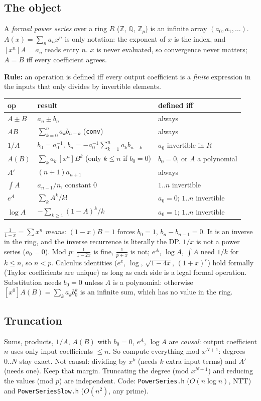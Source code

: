 	\subsection{The object}
	A \emph{formal power series} over a ring $R$ ($\mathbb Z$, $\mathbb Q$, $\mathbb Z_p$) is an infinite array $(a_0,a_1,\dots)$. $A(x)=\sum_n a_nx^n$ is only notation: the exponent of $x$ is the index, and $[x^n]A=a_n$ reads entry $n$. $x$ is never evaluated, so convergence never matters; $A=B$ iff every coefficient agrees.

	\textbf{Rule:} an operation is defined iff every output coefficient is a \emph{finite} expression in the inputs that only divides by invertible elements.
	\begin{center}\small\renewcommand{\arraystretch}{1.3}
	\begin{tabular}{@{}l@{\ \ }L{4.2cm}@{\ \ }L{2.5cm}@{}}
	op & result & defined iff \\ \hline
	$A\pm B$ & $a_n\pm b_n$ & always \\
	$AB$ & $\sum_{k=0}^n a_kb_{n-k}$ (\texttt{conv}) & always \\
	$1/A$ & $b_0=a_0^{-1}$, $b_n=-a_0^{-1}\sum_{k=1}^n a_kb_{n-k}$ & $a_0$ invertible in $R$ \\
	$A(B)$ & $\sum_k a_k\,[x^n]B^k$ (only $k\le n$ if $b_0=0$) & $b_0=0$, or $A$ a polynomial \\
	$A'$ & $(n+1)a_{n+1}$ & always \\
	$\int A$ & $a_{n-1}/n$, constant $0$ & $1..n$ invertible \\
	$e^A$ & $\sum_k A^k/k!$ & $a_0=0$; $1..n$ invertible \\
	$\log A$ & $-\sum_{k\ge1}(1-A)^k/k$ & $a_0=1$; $1..n$ invertible \\
	\end{tabular}
	\end{center}
	$\frac1{1-x}=\sum x^n$ \emph{means}: $(1-x)B=1$ forces $b_0=1$, $b_n-b_{n-1}=0$. It is an inverse in the ring, and the inverse recurrence is literally the DP. $1/x$ is not a power series ($a_0=0$). Mod $p$: $\frac1{1-2x}$ is fine, $\frac1{p+x}$ is not; $e^A$, $\log A$, $\int A$ need $1/k$ for $k\le n$, so $n<p$.
	Calculus identities ($e^x$, $\log$, $\sqrt{1-4x}$, $(1+x)^r$) hold formally (Taylor coefficients are unique) as long as each side is a legal formal operation.
	Substitution needs $b_0=0$ unless $A$ is a polynomial: otherwise $[x^0]A(B)=\sum_k a_kb_0^k$ is an infinite sum, which has no value in the ring.

	\subsection{Truncation}
	Sums, products, $1/A$, $A(B)$ with $b_0=0$, $e^A$, $\log A$ are \emph{causal}: output coefficient $n$ uses only input coefficients $\le n$. So compute everything mod $x^{N+1}$: degrees $0..N$ stay exact.
	Not causal: dividing by $x^k$ (needs $k$ extra input terms) and $A'$ (needs one). Keep that margin.
	Truncating the degree (mod $x^{N+1}$) and reducing the values (mod $p$) are independent.
	Code: \texttt{PowerSeries.h} ($O(n\log n)$, NTT) and \texttt{PowerSeriesSlow.h} ($O(n^2)$, any prime).

